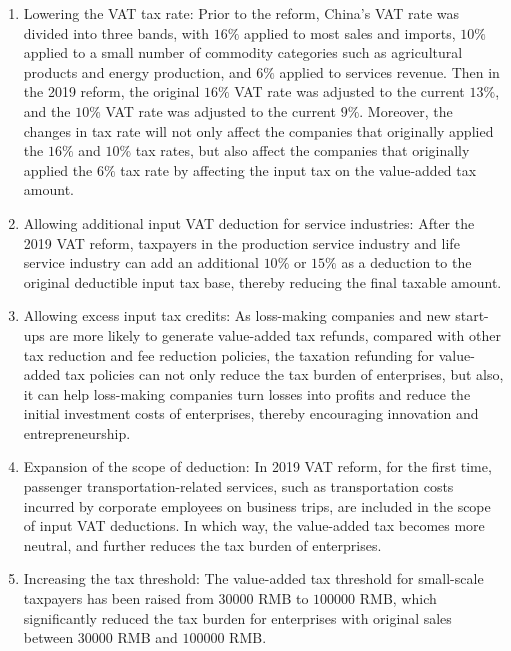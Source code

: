 \documentclass[3p,times]{elsarticle}
\begin{document}
\begin{enumerate}[(1)]
    \item Lowering the VAT tax rate: Prior to the reform, China's VAT rate was divided into three bands, with $16\%$ applied to most sales and imports, $10\%$ applied to a small number of commodity categories such as agricultural products and energy production, and $6\%$ applied to services revenue. Then in the 2019 reform, the original $16\%$ VAT rate was adjusted to the current $13\%$, and the $10\%$ VAT rate was adjusted to the current $9\%$. Moreover, the changes in tax rate will not only affect the companies that originally applied the $16\%$ and $10\%$ tax rates, but also affect the companies that originally applied the $6\%$ tax rate by affecting the input tax on the value-added tax amount.
    
    \item Allowing additional input VAT deduction for service industries: After the 2019 VAT reform, taxpayers in the production service industry and life service industry can add an additional $10\%$ or $15\%$ as a deduction to the original deductible input tax base, thereby reducing the final taxable amount.
    
    \item Allowing excess input tax credits: As loss-making companies and new start-ups are more likely to generate value-added tax refunds, compared with other tax reduction and fee reduction policies, the taxation refunding for value-added tax policies can not only reduce the tax burden of enterprises, but also, it can help loss-making companies turn losses into profits and reduce the initial investment costs of enterprises, thereby encouraging innovation and entrepreneurship.
    
    \item Expansion of the scope of deduction: In 2019 VAT reform, for the first time, passenger transportation-related services, such as transportation costs incurred by corporate employees on business trips, are included in the scope of input VAT deductions. In which way, the value-added tax becomes more neutral, and further reduces the tax burden of enterprises.
    
    \item Increasing the tax threshold: The value-added tax threshold for small-scale taxpayers has been raised from $30000$ RMB to $100000$ RMB, which significantly reduced the tax burden for enterprises with original sales between $30000$ RMB and $100000$ RMB.
    
\end{enumerate}
\end{document}
